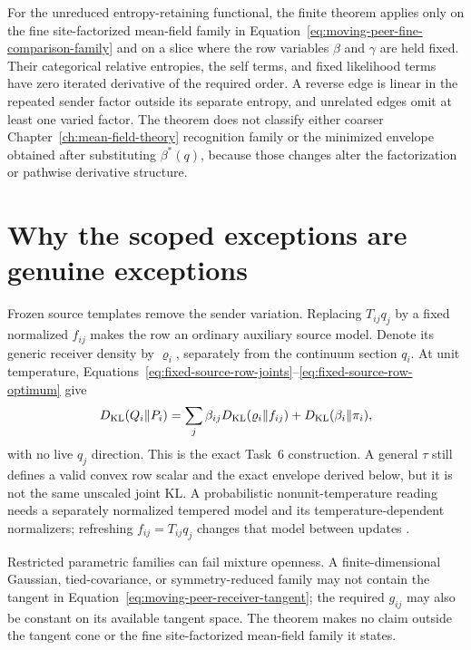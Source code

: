 For the unreduced entropy-retaining functional, the finite theorem applies only on the fine site-factorized mean-field family in Equation~\eqref{eq:moving-peer-fine-comparison-family} and on a slice where the row variables \(\beta\) and \(\gamma\) are held fixed. Their categorical relative entropies, the self terms, and fixed likelihood terms have zero iterated derivative of the required order. A reverse edge is linear in the repeated sender factor outside its separate entropy, and unrelated edges omit at least one varied factor. The theorem does not classify either coarser Chapter~\ref{ch:mean-field-theory} recognition family or the minimized envelope obtained after substituting \(\beta^*(q)\), because those changes alter the factorization or pathwise derivative structure.

\section{Why the scoped exceptions are genuine exceptions}

\begin{samepage}
Frozen source templates remove the sender variation. Replacing \(T_{ij}q_j\) by a fixed normalized \(f_{ij}\) makes the row an ordinary auxiliary source model. Denote its generic receiver density by \(\varrho_i\), separately from the continuum section \(q_i\). At unit temperature, Equations~\eqref{eq:fixed-source-row-joints}--\eqref{eq:fixed-source-row-optimum} give
\begin{equation}
D_{\mathrm{KL}}(Q_i\Vert P_i)
=\sum_j\beta_{ij}D_{\mathrm{KL}}(\varrho_i\Vert f_{ij})
+D_{\mathrm{KL}}(\beta_i\Vert\pi_i),
\label{eq:pifb2-unit-temperature-frozen-row}
\end{equation}
with no live \(q_j\) direction. This is the exact Task~6 construction. A general \(\tau\) still defines a valid convex row scalar and the exact envelope derived below, but it is not the same unscaled joint KL. A probabilistic nonunit-temperature reading needs a separately normalized tempered model and its temperature-dependent normalizers; refreshing \(f_{ij}=T_{ij}q_j\) changes that model between updates \citep{BissiriHolmesWalker2016}.
\end{samepage}

Restricted parametric families can fail mixture openness. A finite-dimensional Gaussian, tied-covariance, or symmetry-reduced family may not contain the tangent in Equation~\eqref{eq:moving-peer-receiver-tangent}; the required \(g_{ij}\) may also be constant on its available tangent space. The theorem makes no claim outside the tangent cone or the fine site-factorized mean-field family it states.


